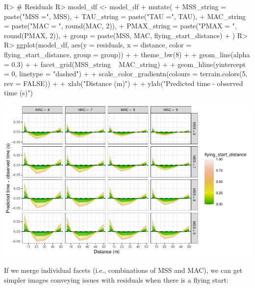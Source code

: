 \documentclass[
]{jss}
\begin{document}
\begin{CodeChunk}
\begin{CodeInput}
R> # Residuals
R> model_df <- model_df %
+   mutate(
+     MSS_string = paste("MSS =", MSS),
+     TAU_string = paste("TAU =", TAU),
+     MAC_string = paste("MAC = ", round(MAC, 2)),
+     PMAX_string = paste("PMAX = ", round(PMAX, 2)),
+     group = paste(MSS, MAC, flying_start_distance)
+   )
R> 
R> ggplot(model_df, aes(y = residuals, x = distance, color = flying_start_distance, group = group)) +
+   theme_bw(8) +
+   geom_line(alpha = 0.3) +
+   facet_grid(MSS_string ~ MAC_string) +
+   geom_hline(yintercept = 0, linetype = "dashed") +
+   scale_color_gradientn(colours = terrain.colors(5, rev = FALSE)) +
+   xlab("Distance (m)") +
+   ylab("Predicted time - observed time (s)")
\end{CodeInput}


\begin{center}\includegraphics[width=1\linewidth]{paper_files/figure-latex/unnamed-chunk-30-1} \end{center}

\end{CodeChunk}

If we merge individual facets (i.e., combinations of MSS and MAC), we can get simpler images conveying issues with residuals when there is a flying start:
\end{document}
